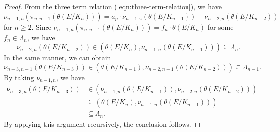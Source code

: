 \documentclass[11pt]{amsart}
\numberwithin{equation}{section}
\theoremstyle{definition}
\begin{document}
\begin{proof}
From the three term relation (\ref{eqn:three-term-relation}), we have
$$\nu_{n-1, n} \left( \pi_{n, n-1} \left( \theta(E/K_{n}) \right) \right) = a_p \cdot \nu_{n-1, n}  \left( \theta(E/K_{n-1}) \right) - \nu_{n-2, n} \left( \theta(E/K_{n-2}) \right) $$
for $n \geq 2$.
Since 
$\nu_{n-1, n} \left( \pi_{n, n-1} \left( \theta(E/K_{n}) \right) \right) = f_n \cdot \theta(E/K_{n})$
for some $f_n \in \Lambda_n$, we have
$$\nu_{n-2, n} \left( \theta(E/K_{n-2}) \right) \in \left( \theta(E/K_n) , \nu_{n-1, n} \left( \theta(E/K_{n-1}) \right) \right) \subseteq \Lambda_n.$$
In the same manner, we can obtain
$$\nu_{n-3, n-1} \left( \theta(E/K_{n-3}) \right) \in \left( \theta(E/K_{n-1}) , \nu_{n-2, n-1} \left( \theta(E/K_{n-2}) \right) \right) \subseteq \Lambda_{n-1}. $$
By taking $\nu_{n-1, n}$, we have
\begin{align*}
\nu_{n-3, n} \left( \theta(E/K_{n-3}) \right) & \in \left( \nu_{n-1, n} \left( \theta(E/K_{n-1}) \right) , \nu_{n-2, n} \left( \theta(E/K_{n-2}) \right) \right) \\
& \subseteq \left( \theta(E/K_{n}), \nu_{n-1, n} \left( \theta(E/K_{n-1}) \right)  \right) \\
& \subseteq \Lambda_{n}. 
\end{align*}
By applying this argument recursively, the conclusion follows.
\end{proof}
\end{document}
